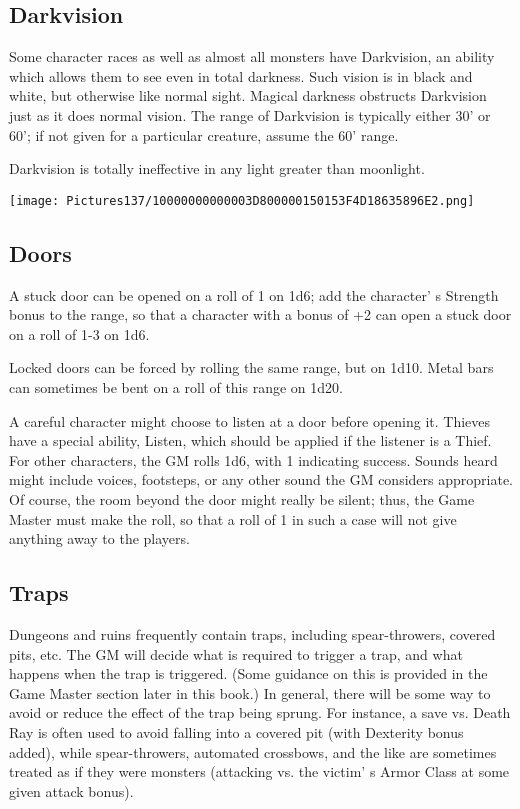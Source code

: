 \documentclass[a4paper,twoside,openany,10pt]{book}
\begin{document}
\begin{multicols}{2}
\subsection{Darkvision}\label{darkvision}

Some character races as well as almost all monsters have Darkvision, an ability which allows them to see even in total darkness. Such vision is in black and white, but otherwise like normal sight. Magical darkness obstructs Darkvision just as it does normal vision. The range of Darkvision is typically either 30' or 60'; if not given for a particular creature, assume the 60' range.

Darkvision is totally ineffective in any light greater than moonlight.


\begin{flushleft}
	\texttt{[image: Pictures137/10000000000003D800000150153F4D18635896E2.png]}
\end{flushleft}

\subsection{Doors}\label{doors}

A stuck door can be opened on a roll of 1 on 1d6; add the character' s Strength bonus to the range, so that a character with a bonus of +2 can open a stuck door on a roll of 1-3 on 1d6.

Locked doors can be forced by rolling the same range, but on 1d10. Metal bars can sometimes be bent on a roll of this range on 1d20.

A careful character might choose to listen at a door before opening it. Thieves have a special ability, Listen, which should be applied if the listener is a Thief. For other characters, the GM rolls 1d6, with 1 indicating success. Sounds heard might include voices, footsteps, or any other sound the GM considers appropriate. Of course, the room beyond the door might really be silent; thus, the Game Master must make the roll, so that a roll of 1 in such a case will not give anything away to the players.

\subsection{Traps}\label{traps}

Dungeons and ruins frequently contain traps, including spear-throwers, covered pits, etc. The GM will decide what is required to trigger a trap, and what happens when the trap is triggered. (Some guidance on this is provided in the Game Master section later in this book.) In general, there will be some way to avoid or reduce the effect of the trap being sprung. For instance, a save vs. Death Ray is often used to avoid falling into a covered pit (with Dexterity bonus added), while spear-throwers, automated crossbows, and the like are sometimes treated as if they were monsters (attacking vs. the victim' s Armor Class at some given attack bonus).


\end{multicols}
\end{document}
